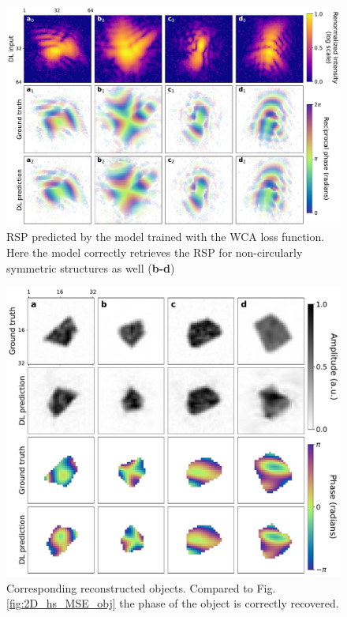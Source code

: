 \begin{figure}[H]
    \centering
    \includegraphics[width=\textwidth]{figures/Phasing/2D_hs_VFN_RSP.pdf}
    \caption{RSP predicted by the model trained with the WCA loss function. Here the model correctly retrieves the RSP for 
    non-circularly symmetric structures as well (\textbf{b-d})} 
    \label{fig:2D_hs_VFN_RSP}
\end{figure}

\begin{figure}[H]
    \centering
    \includegraphics[width=\textwidth]{figures/Phasing/2D_hs_VFN_obj.pdf}
    \caption{Corresponding reconstructed objects. Compared to Fig.\ref{fig:2D_hs_MSE_obj} the phase of the object is 
    correctly recovered.} 
    \label{fig:2D_hs_VFN_obj}
\end{figure}


